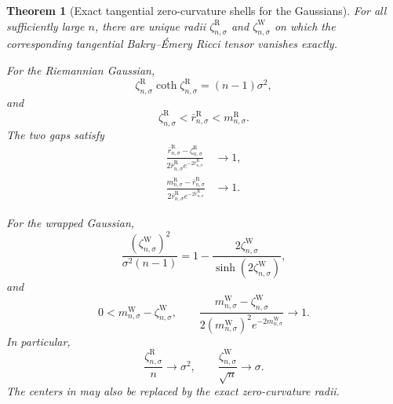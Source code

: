 \documentclass{amsart}
\numberwithin{equation}{section}
\theoremstyle{plain}
\newtheorem{thm}{Theorem}[section]
\theoremstyle{definition}
\theoremstyle{remark}
\begin{document}
\begin{thm}[Exact tangential zero-curvature shells for the Gaussians]
\label{thm:gaussian-zero-shells}
	For all sufficiently large $n$, there are unique radii
	$\zeta^{\mathrm R}_{n,\sigma}$ and
	$\zeta^{\mathrm W}_{n,\sigma}$ on which the corresponding tangential
	Bakry--\'Emery Ricci tensor vanishes exactly.

	For the Riemannian Gaussian,
	\begin{equation}\label{eq:R-zero-equation}
		\zeta^{\mathrm R}_{n,\sigma}
		\coth\zeta^{\mathrm R}_{n,\sigma}
		=
		(n-1)\sigma^2,
	\end{equation}
	and
	\begin{equation}\label{eq:R-zero-sandwich}
		\zeta^{\mathrm R}_{n,\sigma}
		<
		\bar r^{\mathrm R}_{n,\sigma}
		<
		m^{\mathrm R}_{n,\sigma}.
	\end{equation}
	The two gaps satisfy
	\begin{align}
		\frac{\bar r^{\mathrm R}_{n,\sigma}
		-\zeta^{\mathrm R}_{n,\sigma}}
		{2\bar r^{\mathrm R}_{n,\sigma}
		e^{-2\bar r^{\mathrm R}_{n,\sigma}}}
		&\longrightarrow1,
		\label{eq:R-zero-gap}\\
		\frac{m^{\mathrm R}_{n,\sigma}
		-\bar r^{\mathrm R}_{n,\sigma}}
		{2\bar r^{\mathrm R}_{n,\sigma}
		e^{-2\bar r^{\mathrm R}_{n,\sigma}}}
		&\longrightarrow1.
		\label{eq:R-mode-gap}
	\end{align}

	For the wrapped Gaussian,
	\begin{equation}\label{eq:W-zero-equation}
		\frac{(\zeta^{\mathrm W}_{n,\sigma})^2}
		{\sigma^2(n-1)}
		=
		1-\frac{2\zeta^{\mathrm W}_{n,\sigma}}
		{\sinh(2\zeta^{\mathrm W}_{n,\sigma})},
	\end{equation}
	and
	\begin{equation}\label{eq:W-zero-gap}
		0<m^{\mathrm W}_{n,\sigma}-\zeta^{\mathrm W}_{n,\sigma},
		\qquad
		\frac{m^{\mathrm W}_{n,\sigma}
		-\zeta^{\mathrm W}_{n,\sigma}}
		{2(m^{\mathrm W}_{n,\sigma})^2
		e^{-2m^{\mathrm W}_{n,\sigma}}}
		\longrightarrow1.
	\end{equation}
	In particular,
	\begin{equation}\label{eq:zero-scales}
		\frac{\zeta^{\mathrm R}_{n,\sigma}}n\longrightarrow\sigma^2,
		\qquad
		\frac{\zeta^{\mathrm W}_{n,\sigma}}{\sqrt n}\longrightarrow\sigma.
	\end{equation}
	The centers in  may also be replaced by
	the exact zero-curvature radii.
\end{thm}
\end{document}

